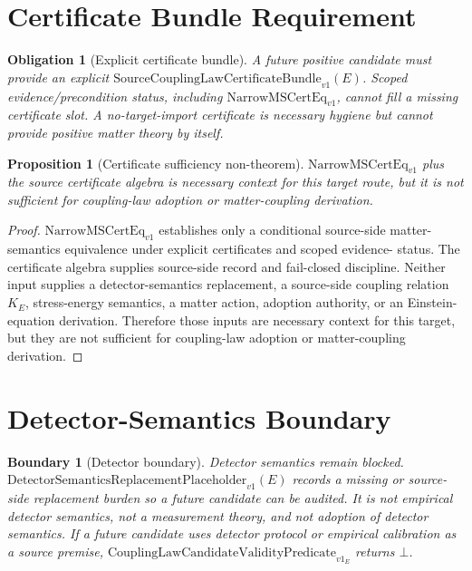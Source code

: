 \documentclass[11pt]{article}
\newcommand{\NarrowMSCertEq}{\mathrm{NarrowMSCertEq}_{v1}}
\newcommand{\SCLBundle}{\mathrm{SourceCouplingLawCertificateBundle}_{v1}}
\newcommand{\DetPlaceholder}{\mathrm{DetectorSemanticsReplacementPlaceholder}_{v1}}
\newcommand{\Validity}{\mathrm{CouplingLawCandidateValidityPredicate}_{v1}}
\newcommand{\Bottom}{\bot}
\newtheorem{proposition}{Proposition}
\newtheorem{obligation}{Obligation}
\newtheorem{boundary}{Boundary}
\begin{document}
\section{Certificate Bundle Requirement}

\begin{obligation}[Explicit certificate bundle]
A future positive candidate must provide an explicit \(\SCLBundle(E)\). Scoped
evidence/precondition status, including \(\NarrowMSCertEq\), cannot fill a
missing certificate slot. A no-target-import certificate is necessary hygiene
but cannot provide positive matter theory by itself.
\end{obligation}

\begin{proposition}[Certificate sufficiency non-theorem]
\(\NarrowMSCertEq\) plus the source certificate algebra is necessary context
for this target route, but it is not sufficient for coupling-law adoption or
matter-coupling derivation.
\end{proposition}

\begin{proof}
\(\NarrowMSCertEq\) establishes only a conditional source-side
matter-semantics equivalence under explicit certificates and scoped evidence-
status. The certificate algebra supplies source-side record and fail-closed
discipline. Neither input supplies a detector-semantics replacement, a
source-side coupling relation \(K_E\), stress-energy semantics, a matter
action, adoption authority, or an Einstein-equation derivation. Therefore
those inputs are necessary context for this target, but they are not
sufficient for coupling-law adoption or matter-coupling derivation.
\end{proof}

\section{Detector-Semantics Boundary}

\begin{boundary}[Detector boundary]
Detector semantics remain blocked. \(\DetPlaceholder(E)\) records a missing
or source-side replacement burden so a future candidate can be audited. It is
not empirical detector semantics, not a measurement theory, and not adoption
of detector semantics. If a future candidate uses detector protocol or
empirical calibration as a source premise, \(\Validity_E\) returns
\(\Bottom\).
\end{boundary}
\end{document}
